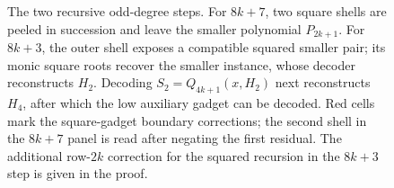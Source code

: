 \begin{figure}[H]
  \centering
  \resizebox{\textwidth}{!}{}
  \caption{The two recursive odd-degree steps.  For $8k+7$, two square
  shells are peeled in succession and leave the smaller polynomial
  $P_{2k+1}$.  For $8k+3$, the outer shell exposes a compatible squared
  smaller pair; its monic square roots recover the smaller instance, whose
  decoder reconstructs $H_2$.  Decoding $S_2=Q_{4k+1}(x,H_2)$ next
  reconstructs $H_4$, after which the low auxiliary gadget can be decoded.
  Red cells mark the square-gadget boundary corrections; the second shell
  in the $8k+7$ panel is read after negating the first residual.  The
  additional row-$2k$ correction for the squared recursion in the $8k+3$
  step is given in the proof.}
  \label{fig:odd-induction-steps}
\end{figure}

